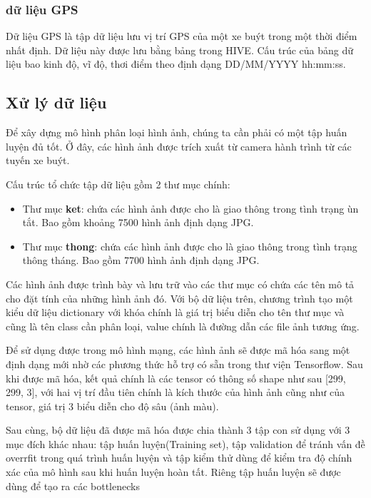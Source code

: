 	\subsubsection{dữ liệu GPS }
	Dữ liệu GPS là tập dữ liệu lưu vị trí GPS của một xe buýt trong một thời điểm nhất định. Dữ liệu này được lưu bằng bảng trong HIVE. Cấu trúc của bảng dữ liệu bao kinh độ, vĩ độ, thơi điểm theo định dạng DD/MM/YYYY hh:mm:ss.
	
	

	\subsection{Xử lý dữ liệu}
	
	Để xây dựng mô hình phân loại hình ảnh, chúng ta cần phải có một tập huấn luyện đủ tốt. Ở đây, các hình ảnh được trích xuất từ camera hành trình từ các tuyến xe buýt. \par
	Cấu trúc tổ chức tập dữ liệu gồm 2 thư mục chính:
	\begin{itemize}
		\item Thư mục \textbf{ket}: chứa các hình ảnh được cho là giao thông trong tình trạng ùn tắt. Bao gồm khoảng 7500 hình ảnh định dạng JPG.
		\item Thư mục \textbf{thong}: chứa các hình ảnh được cho là giao thông trong tình trạng thông tháng. Bao gồm 7700 hình ảnh định dạng JPG.
	\end{itemize}
	
		Các hình ảnh được trình bày và lưu trữ vào các thư mục có chứa các tên mô tả cho đặt tính của những hình ảnh đó. Với bộ dữ liệu trên, chương trình tạo một kiểu dữ liệu dictionary với khóa chính là giá trị biểu diễn cho tên thư mục và cũng là tên class cần phân loại, value chính là đường dẫn các file ảnh tương ứng.\par
		 Để sử dụng được trong mô hình mạng, các hình ảnh sẽ được mã hóa sang một định dạng mới nhờ các phương thức hỗ trợ có sẵn trong thư viện Tensorflow. Sau khi được mã hóa, kết quả chính là các tensor có thông số shape như sau [299, 299, 3], với hai vị trí đầu tiên chính là kích thước của hình ảnh cũng như của tensor, giá trị 3 biểu diễn cho độ sâu (ảnh màu).\par
	 	Sau cùng, bộ dữ liệu đã được mã hóa được chia thành 3 tập con sử dụng với 3 mục đích khác nhau: tập huấn luyện(Training set), tập validation để tránh vấn đề overrfit trong quá trình huấn luyện và tập kiểm thử dùng để kiểm tra độ chính xác của mô hình sau khi huấn luyện hoàn tất.	Riêng tập huấn luyện sẽ được dùng để tạo ra các bottlenecks
	
